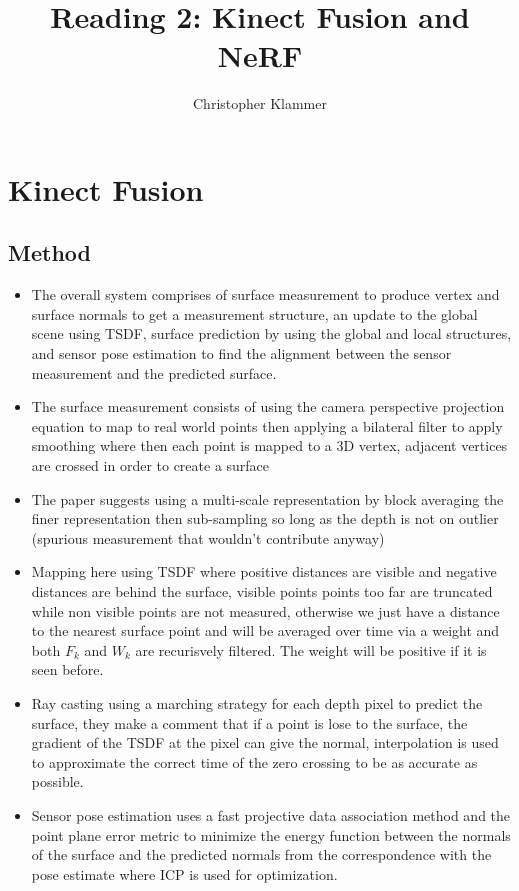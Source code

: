 \documentclass[12pt, a4paper]{article}
\title{Reading 2: Kinect Fusion and NeRF}
\author{Christopher Klammer}
\begin{document}
\maketitle
\section{Kinect Fusion}

\subsection{Method}
\begin{itemize}
    \item The overall system comprises of surface measurement to produce vertex and surface normals to get a measurement structure, an update to the global scene using TSDF, surface prediction by using the global and local structures, and sensor pose estimation to find the alignment between the sensor measurement and the predicted surface.
    \item The surface measurement consists of using the camera perspective projection equation to map to real world points then applying a bilateral filter to apply smoothing where then each point is mapped to a 3D vertex, adjacent vertices are crossed in order to create a surface
    \item The paper suggests using a multi-scale representation by block averaging the finer representation then sub-sampling so long as the depth is not on outlier (spurious measurement that wouldn't contribute anyway)
    \item Mapping here using TSDF where positive distances are visible and negative distances are behind the surface, visible points points too far are truncated while non visible points are not measured, otherwise we just have a distance to the nearest surface point and will be averaged over time via a weight and both $F_k$ and $W_k$ are recurisvely filtered. The weight will be positive if it is seen before.
    \item Ray casting using a marching strategy for each depth pixel to predict the surface, they make a comment that if a point is lose to the surface, the gradient of the TSDF at the pixel can give the normal, interpolation is used to approximate the correct time of the zero crossing to be as accurate as possible.
    \item Sensor pose estimation uses a fast projective data association method and the point plane error metric to minimize the energy function between the normals of the surface and the predicted normals from the correspondence with the pose estimate where ICP is used for optimization.
\end{itemize}
\end{document}

